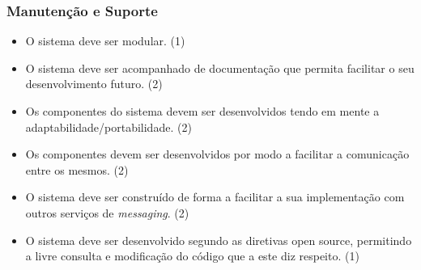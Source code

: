 \documentclass[11pt,a4paper]{article}
\newcommand{\requirement}[3]{
    #1 (#3)
}
\begin{document}
\begin{appendices}
\subsubsection{Manutenção e Suporte}
\begin{itemize}
    \setlength\itemsep{0em}
    \item \requirement
    {O sistema deve ser modular.}
    {O desenvolvimento de um sistema modular permitirá a alteração de cada módulo de forma 
    simples e rápida e independente dos restantes, sem colocar em causa o sistema.}
    {1}
    \item \requirement
    {O sistema deve ser acompanhado de documentação que permita facilitar o seu desenvolvimento futuro.}
    {A presença de uma documentação extensiva permite uma fácil interpretação e integração de pessoas 
    que entrem recentemente no projeto.}
    {2}
    \item \requirement
    {Os componentes do sistema devem ser desenvolvidos tendo em mente a adaptabilidade/portabilidade.}
    {O objetivo é que no futuro seja possível mudar o âmbito do projeto para outros fornecedores de serviços.}
    {2} 
    \item \requirement
    {Os componentes devem ser desenvolvidos por modo a facilitar a comunicação entre os mesmos.}
    {A facilidade de comunicação entre os diferentes componentes possibilita uma expansão do sistema mais prática e funcional.}
    {2}
    \item \requirement
    {O sistema deve ser construído de forma a facilitar a sua implementação com outros serviços de \emph{messaging}.}
    {No futuro pretende-se que o sistema possa ser ``portado'' para outros serviços de \emph{messaging}.}
    {2}
    \item \requirement
    {O sistema deve ser desenvolvido segundo as diretivas open source, permitindo a livre consulta e modificação
    do código que a este diz respeito.}
    {O desenvolvimento do sistema assente em princípios open source facilita a auditoria e contribuição para 
    o código desenvolvido por parte da comunidade, resultando num sistema mais robusto.}
    {1}
\end{itemize}


\end{appendices}
\end{document}
